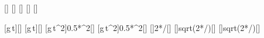 [\mpss]
[\mpss]
[\s]
[\s]
[\m]

[g\,t]{\gzX*\taX}[\mps]
[g\,t]{\gEX*\taX}[\mps]
[g\,t^2]{0.5*\gzX*\tbX^2}[\m]
[g\,t^2]{0.5*\gEX*\tbX^2}[\m]
[]{2*\hcX/\gzX}[\second\squared]
[]{sqrt(2*\hcX/\gzX)}[\s]
[]{sqrt(2*\hcX/\gEX)}[\s]

